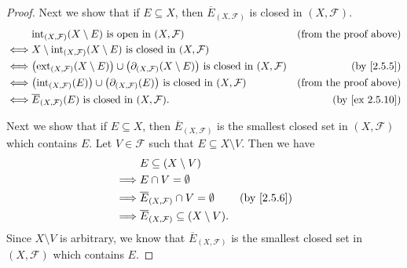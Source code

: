 \begin{proof}
  Next we show that if \(E \subseteq X\), then \(\overline{E}_{(X, \mathcal{F})}\) is closed in \((X, \mathcal{F})\).
  \begin{align*}
         & \text{int}_{(X, \mathcal{F})}(X \setminus E) \text{ is open in } (X, \mathcal{F})                                                                       & \text{(from the proof above)} \\
    \iff & X \setminus \text{int}_{(X, \mathcal{F})}(X \setminus E) \text{ is closed in } (X, \mathcal{F})                                                                                         \\
    \iff & \big(\text{ext}_{(X, \mathcal{F})}(X \setminus E)\big) \cup \big(\partial_{(X, \mathcal{F})}(X \setminus E)\big) \text{ is closed in } (X, \mathcal{F}) & \text{(by \cref{2.5.5})}      \\
    \iff & \big(\text{int}_{(X, \mathcal{F})}(E)\big) \cup \big(\partial_{(X, \mathcal{F})}(E)\big) \text{ is closed in } (X, \mathcal{F})                         & \text{(from the proof above)} \\
    \iff & \overline{E}_{(X, \mathcal{F})}(E) \text{ is closed in } (X, \mathcal{F}).                                                                              & \text{(by \cref{ex 2.5.10})}
  \end{align*}

  Next we show that if \(E \subseteq X\), then \(\overline{E}_{(X, \mathcal{F})}\) is the smallest closed set in \((X, \mathcal{F})\) which contains \(E\).
  Let \(V \in \mathcal{F}\) such that \(E \subseteq X \setminus V\).
  Then we have
  \begin{align*}
             & E \subseteq (X \setminus V)                                                           \\
    \implies & E \cap V = \emptyset                                                                  \\
    \implies & \overline{E}_{(X, \mathcal{F})} \cap V = \emptyset         & \text{(by \cref{2.5.6})} \\
    \implies & \overline{E}_{(X, \mathcal{F})} \subseteq (X \setminus V).
  \end{align*}
  Since \(X \setminus V\) is arbitrary, we know that \(\overline{E}_{(X, \mathcal{F})}\) is the smallest closed set in \((X, \mathcal{F})\) which contains \(E\).


\end{proof}

